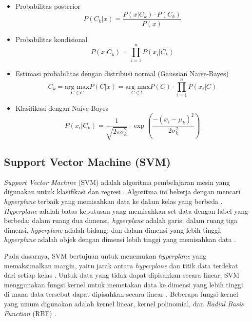\documentclass[conference]{IEEEtran}
\begin{document}
\begin{itemize}
    \item Probabilitas posterior
        \begin{equation}
            P(C_k | x) = \frac{P(x | C_k) \cdot P(C_k)}{P(x)}
        \end{equation}
    \item Probabilitas kondisional
        \begin{equation}
            P(x | C_k) = \prod_{i=1}^{n} P(x_i | C_k)
        \end{equation}
    \item Estimasi probabilitas dengan distribusi normal (Gaussian Naive-Bayes)
        \begin{equation}
            C_k = \underset{C \in C}{\text{arg max}} P(C | x) = \underset{C \in C}{\text{arg max}} P(C) \cdot \prod_{i=1}^{n} P(x_i | C)
        \end{equation}
    \item Klasifikasi dengan Naive-Bayes
        \begin{equation}
            P(x_i | C_k) = \frac{1}{\sqrt{2 \pi \sigma_k^2}} \cdot \exp \left( \frac{-(x_i - \mu_k)^2}{2 \sigma_k^2} \right)
        \end{equation}
\end{itemize}

\subsection{Support Vector Machine (SVM)}

\textit{Support Vector Machine} (SVM) adalah algoritma pembelajaran mesin yang digunakan untuk klasifikasi dan regresi \cite{b21}. Algoritma ini bekerja dengan mencari 
\textit{hyperplane} terbaik yang memisahkan data ke dalam kelas yang berbeda \cite{b20}. \textit{Hyperplane} adalah batas keputusan yang memisahkan set data dengan label yang berbeda; 
dalam ruang dua dimensi, \textit{hyperplane} adalah garis; dalam ruang tiga dimensi, \textit{hyperplane} adalah bidang; dan dalam dimensi yang lebih tinggi, \textit{hyperplane} adalah objek dengan 
dimensi lebih tinggi yang memisahkan data \cite{b22}.

Pada dasarnya, SVM bertujuan untuk menemukan \textit{hyperplane} yang memaksimalkan margin, yaitu jarak antara \textit{hyperplane} dan titik data terdekat dari setiap kelas \cite{b21}. 
Untuk data yang tidak dapat dipisahkan secara linear, SVM menggunakan fungsi kernel untuk memetakan data ke dimensi yang lebih tinggi di mana data tersebut dapat dipisahkan secara linear \cite{b22}. 
Beberapa fungsi kernel yang umum digunakan adalah kernel linear, kernel polinomial, dan \textit{Radial Basis Function} (RBF) \cite{b20}.
\end{document}
